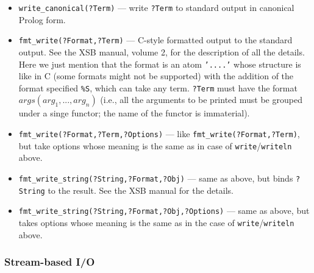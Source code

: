 \documentclass[11pt]{article}
\begin{document}
\begin{itemize}
\item {\tt write\_canonical(?Term)} --- write {\tt ?Term} to standard output
  in canonical Prolog form.
\item {\tt fmt\_write(?Format,?Term)} --- C-style formatted output to the
  standard output. See the XSB manual, volume 2, for the description of all
  the details. Here we just mention that the format is an atom
  \texttt{'....'} whose structure is like in C (some formats might not be
  supported) with the addition of the format specified \texttt{\%S}, which
  can take any term. \texttt{?Term} must have the format
  \texttt{$args(arg_1,...,arg_n)$} (i.e., all the arguments to be printed
  must be grouped under a singe functor; the name of the functor is
  immaterial).
\item {\tt fmt\_write(?Format,?Term,?Options)} --- like
  \texttt{fmt\_write(?Format,?Term)}, but take options whose meaning is the
  same as in case of \texttt{write}/\texttt{writeln} above.  
\item {\tt fmt\_write\_string(?String,?Format,?Obj)} --- same as above, but
  binds
  {\tt ?String} to the result. See the XSB manual for the details.
\item {\tt fmt\_write\_string(?String,?Format,?Obj,?Options)} --- same as
  above, but takes options whose meaning is the same as in the case of
  \texttt{write}/\texttt{writeln} above.
\end{itemize}

\subsubsection{Stream-based I/O}
\end{document}
